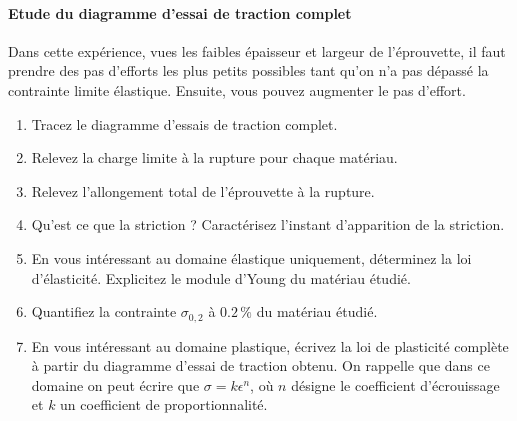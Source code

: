 \documentclass[lecture.tex]{subfiles}
\begin{document}
\paragraph*{Etude du diagramme d'essai de traction complet}\par
\label{Sec_DiagEssai}
Dans cette expérience, vues les faibles épaisseur et largeur de l'éprouvette, il faut prendre des pas d'efforts les plus petits possibles tant qu'on n'a pas dépassé la contrainte limite élastique. Ensuite, vous pouvez augmenter le pas d'effort.

\begin{enumerate}[resume]
\item Tracez le diagramme d'essais de traction complet.
\item Relevez la charge limite à la rupture pour chaque matériau.
\item Relevez l'allongement total de l'éprouvette à la rupture.
\item {} Qu'est ce que la striction ? Caractérisez l'instant d'apparition de la striction.
\item En vous intéressant au domaine élastique uniquement, déterminez la loi d'élasticité. Explicitez le module d'Young du matériau étudié.
\item Quantifiez la contrainte $\sigma_{0,2}$ à $0.2\,\%$ du matériau étudié.
\item En vous intéressant au domaine plastique, écrivez la loi de plasticité complète à partir du diagramme d'essai de traction obtenu. On rappelle que dans ce domaine on peut écrire que $\sigma = k\epsilon^n$, où $n$ désigne  le coefficient d'écrouissage et $k$ un coefficient de proportionnalité.
\end{enumerate}

%
\end{document}
